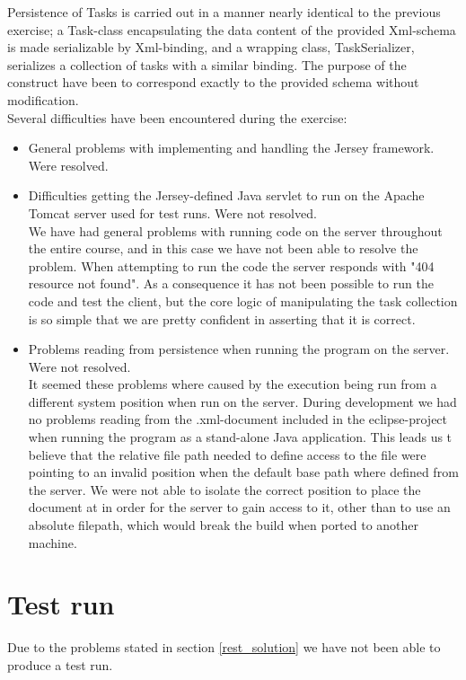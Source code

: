 \documentclass{report}
\begin{document}
	Persistence of Tasks is carried out in a manner nearly identical to the previous exercise; a Task-class encapsulating the data content of the provided Xml-schema is made serializable by Xml-binding, and a wrapping class, TaskSerializer, serializes a collection of tasks with a similar binding. The purpose of the construct have been to correspond exactly to the provided schema without modification.\\
	
	Several difficulties have been encountered during the exercise:
	\begin{itemize}
		\item General problems with implementing and handling the Jersey framework. Were resolved.
		\item Difficulties getting the Jersey-defined Java servlet to run on the Apache Tomcat server used for test runs. Were not resolved.\\
		We have had general problems with running code on the server throughout the entire course, and in this case we have not been able to resolve the problem. When attempting to run the code the server responds with "404 resource not found". As a consequence it has not been possible to run the code and test the client, but the core logic of manipulating the task collection is so simple that we are pretty confident in asserting that it is correct.
		\item Problems reading from persistence when running the program on the server. Were not resolved.\\
		It seemed these problems where caused by the execution being run from a different system position when run on the server. During development we had no problems reading from the .xml-document included in the eclipse-project when running the program as a stand-alone Java application. This leads us t believe that the relative file path needed to define access to the file were pointing to an invalid position when the default base path where defined from the server. We were not able to isolate the correct position to place the document at in order for the server to gain access to it, other than to use an absolute filepath, which would break the build when ported to another machine.
	\end{itemize}
	\section{Test run}
	\label{rest_test}
		Due to the problems stated in section \ref{rest_solution} we have not been able to produce a test run.
\end{document}
